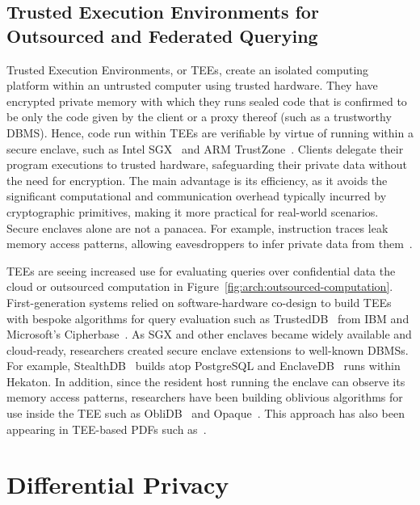\documentclass[11pt]{article}
\begin{document}
\subsection{Trusted Execution Environments for Outsourced and Federated Querying} 
\label{sec:tees}

Trusted Execution Environments, or TEEs, create an isolated computing platform within an untrusted computer using trusted hardware.  They have encrypted private memory with which they runs sealed code that is confirmed to be only the code given by the client or a proxy thereof (such as a trustworthy DBMS).  Hence, code run within TEEs are verifiable by virtue of running within a secure enclave, such as Intel SGX~\cite{dinh2019everything} and ARM TrustZone~\cite{pinto2019demystifying}.   Clients  delegate their program executions to trusted hardware, safeguarding their private data without the need for encryption. The main advantage is its efficiency, as it avoids the significant computational and communication overhead typically incurred by cryptographic primitives, making it more practical for real-world scenarios. Secure enclaves alone are not a panacea. For example, instruction traces leak memory access patterns, allowing eavesdroppers to infer private data from them~\cite{kellaris2016generic,markatou2019full}.

TEEs are seeing increased use for evaluating queries over confidential data  the cloud or outsourced computation in Figure~\ref{fig:arch:outsourced-computation}.  First-generation systems relied on software-hardware co-design to build TEEs with bespoke algorithms for query evaluation such as TrustedDB~\cite{bajaj2011trusteddb} from IBM and Microsoft's Cipherbase~\cite{arasu2013orthogonal}.  As SGX and other enclaves became widely available and cloud-ready, researchers created secure enclave extensions to well-known DBMSs.  For example, StealthDB~\cite{vinayagamurthy2019stealthdb} builds atop PostgreSQL and EnclaveDB~\cite{priebe2018enclavedb} runs within Hekaton.  In addition, since the resident host running the enclave can observe its memory access patterns, researchers have been building oblivious algorithms for use inside the TEE such as ObliDB~\cite{eskandarian2019oblidb} and Opaque~\cite{zheng2017opaque}.  This approach has also been appearing in TEE-based PDFs such as~\cite{dave2020oblivious}. 





\section{Differential Privacy} 
\label{sec:dp}
\end{document}
